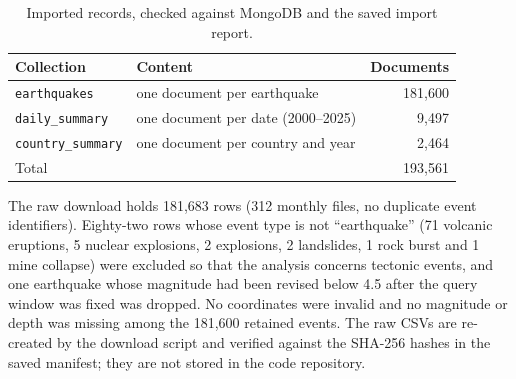 \documentclass[11pt,a4paper]{article}
\begin{document}
\begin{table}[H]\centering
\caption{Imported records, checked against MongoDB and the saved import report.}
\begin{tabular}{llr}\toprule
Collection & Content & Documents\\\midrule
\texttt{earthquakes} & one document per earthquake & 181,600\\
\texttt{daily\_summary} & one document per date (2000--2025) & 9,497\\
\texttt{country\_summary} & one document per country and year & 2,464\\\midrule
Total & & 193,561\\\bottomrule
\end{tabular}
\end{table}
The raw download holds 181,683 rows (312 monthly files, no duplicate event identifiers). Eighty-two rows whose event type is not ``earthquake'' (71 volcanic eruptions, 5 nuclear explosions, 2 explosions, 2 landslides, 1 rock burst and 1 mine collapse) were excluded so that the analysis concerns tectonic events, and one earthquake whose magnitude had been revised below 4.5 after the query window was fixed was dropped. No coordinates were invalid and no magnitude or depth was missing among the 181,600 retained events. The raw CSVs are re-created by the download script and verified against the SHA-256 hashes in the saved manifest; they are not stored in the code repository.
\end{document}
